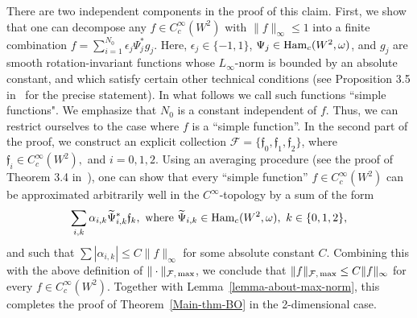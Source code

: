 \documentclass{icmart}
\theoremstyle{definition}
\begin{document}
\smallskip



There are two independent components  in the
proof of this claim. First, we show that one can
decompose any $f \in C_c^{\infty}(W^2)$ with $\| f \|_{{\infty}} \leqslant 1$
into a finite combination $f = \sum_{i=1}^{N_0} \epsilon_j \Psi^*_j g_j$. Here, $ \epsilon_j \in \{ -1, 1 \} $, $\Psi_j \in {\rm Ham}_c(W^2,\omega)$, and $g_j$ are smooth rotation-invariant %
functions  whose $L_{\infty}$-norm is bounded by an absolute
constant, and
%
which satisfy certain other technical conditions (see
Proposition 3.5 in~\cite{BO} for the precise
statement). In what follows we call such functions ``simple
functions". We emphasize that $N_0$ is a constant independent of
$f$. Thus, we can restrict ourselves to the case where $f$ is a
``simple function''. In the second part of the proof, we construct
an explicit collection ${\mathcal F} = \{ {\mathfrak f_0},
{\mathfrak f_1} , {\mathfrak f_2} \} $, where ${\mathfrak f_i} \in
C_c^{\infty}(W^2),$ and $i=0,1,2$. %
Using an averaging procedure
(see the proof of Theorem 3.4 in~\cite{BO}), one can show that every
``simple function'' $f \in C_c^{\infty}(W^2)$ can be approximated
arbitrarily well in the $C^{\infty}$-topology by a sum of the form
$$ \sum_{i,k} \alpha_{i,k} \widetilde \Psi_{i,k}^* {\mathfrak f}_{k}, \ {\rm where \ }  \widetilde \Psi_{i,k} \in {\rm Ham}_c(W^2,\omega), \ k \in \{0,1,2 \}, $$ %
and such that $\sum | \alpha_{i,k} | \leq C \| f \|_{\infty}$ for
some absolute constant $C$. Combining this with the above definition
of $\| \cdot \|_{{\mathcal F}, \, {\rm max}}$, we conclude that
$ \| f \|_{{\mathcal F}, \, {\rm max}} \leq C \| f \|_{\infty}$ for every
$f \in C_c^{\infty}(W^2)$. Together with Lemma~\ref{lemma-about-max-norm}, this completes the proof of
Theorem~\ref{Main-thm-BO} in the 2-dimensional case.
\end{document}
